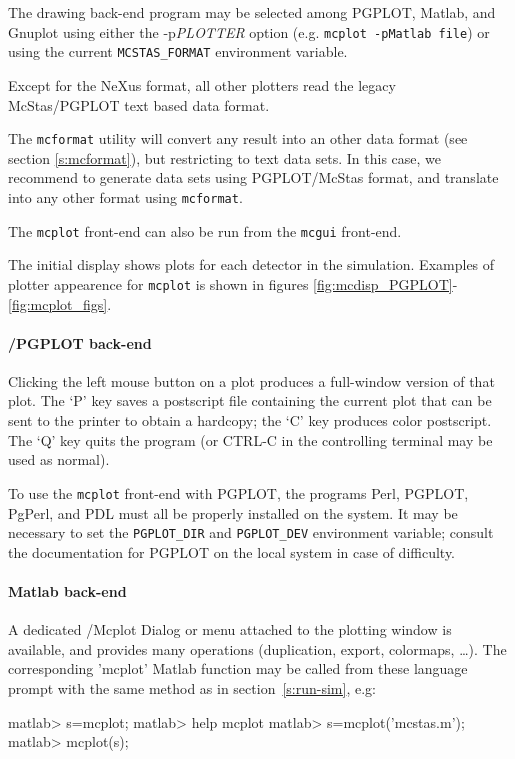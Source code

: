 The drawing back-end program may be selected among PGPLOT, Matlab, and
Gnuplot using either the -p\textit{PLOTTER} option (e.g. \texttt{mcplot -pMatlab
file}) or using the current \verb+MCSTAS_FORMAT+ environment
variable.

Except for the NeXus format, all other plotters read the legacy 
McStas/PGPLOT text based data format. 

The \verb+mcformat+ utility will convert any \MCS
result into an other data format (see section \ref{s:mcformat}), but restricting to text
data sets. In this case, we recommend to generate data sets using PGPLOT/McStas
format, and translate into any other format using \verb+mcformat+.

The \verb+mcplot+ front-end can also be run from the \verb+mcgui+ front-end.

The initial display shows plots for each detector in the simulation.
Examples of plotter appearence for \verb+mcplot+ is shown in figures
 \ref{fig:mcdisp_PGPLOT}-\ref{fig:mcplot_figs}.

\paragraph{\MCS /PGPLOT back-end}
Clicking the left mouse button on a plot produces a full-window version
of that plot. The `P' key saves a postscript file containing the current
plot that can be sent to the printer to obtain a hardcopy; the `C' key
produces color postscript.
The `Q' key quits the program (or CTRL-C in the controlling
terminal may be used as normal).

To use the \verb+mcplot+ front-end with PGPLOT, the programs Perl, PGPLOT,
PgPerl, and PDL must all be properly installed on the system.  It may be
necessary to set the \verb+PGPLOT_DIR+ and \verb+PGPLOT_DEV+ environment
variable; consult the documentation for PGPLOT on the local system in case of
difficulty.

\paragraph{Matlab back-end}

A dedicated \MCS /Mcplot Dialog or menu attached to the plotting window is
available, and provides many operations (duplication, export, colormaps,
\ldots).  The corresponding 'mcplot' Matlab function may be called
from these language prompt with the same method as in section~\ref{s:run-sim},
e.g:
\begin{matlab}
    matlab> s=mcplot;
    matlab> help mcplot
    matlab> s=mcplot('mcstas.m');
    matlab> mcplot(s);
\end{matlab} 

